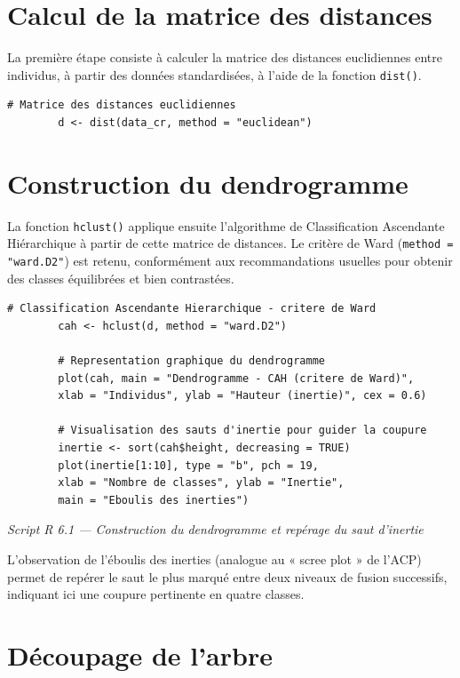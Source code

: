 \documentclass[11pt,a4paper]{report}
\newcommand{\rcaption}[1]{%
	\begin{center}\small\itshape\color{grey} #1\end{center}\vspace{4pt}
}
\begin{document}
	\section{Calcul de la matrice des distances}
	
	La première étape consiste à calculer la matrice des distances euclidiennes entre individus, à partir des données standardisées, à l'aide de la fonction \texttt{dist()}.
	
	\begin{lstlisting}[style=rstyle]
		# Matrice des distances euclidiennes
		d <- dist(data_cr, method = "euclidean")
	\end{lstlisting}
	
	\section{Construction du dendrogramme}
	
	La fonction \texttt{hclust()} applique ensuite l'algorithme de Classification Ascendante Hiérarchique à partir de cette matrice de distances. Le critère de Ward (\texttt{method = "ward.D2"}) est retenu, conformément aux recommandations usuelles pour obtenir des classes équilibrées et bien contrastées.
	
	\begin{lstlisting}[style=rstyle]
		# Classification Ascendante Hierarchique - critere de Ward
		cah <- hclust(d, method = "ward.D2")
		
		# Representation graphique du dendrogramme
		plot(cah, main = "Dendrogramme - CAH (critere de Ward)",
		xlab = "Individus", ylab = "Hauteur (inertie)", cex = 0.6)
		
		# Visualisation des sauts d'inertie pour guider la coupure
		inertie <- sort(cah$height, decreasing = TRUE)
		plot(inertie[1:10], type = "b", pch = 19,
		xlab = "Nombre de classes", ylab = "Inertie",
		main = "Eboulis des inerties")
	\end{lstlisting}
	\rcaption{Script R 6.1 --- Construction du dendrogramme et repérage du saut d'inertie}
	
	L'observation de l'éboulis des inerties (analogue au « scree plot » de l'ACP) permet de repérer le saut le plus marqué entre deux niveaux de fusion successifs, indiquant ici une coupure pertinente en quatre classes.
	
	\section{Découpage de l'arbre}
	
\end{document}

